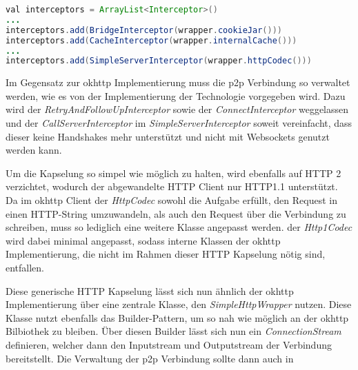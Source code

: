         \begin{lstlisting}[frame=bt, label={lst:android:okhttpchanges}, language=Java, caption=Änderungen an okhttp (Clientcode in Kotlin)]
val interceptors = ArrayList<Interceptor>()
...
interceptors.add(BridgeInterceptor(wrapper.cookieJar()))
interceptors.add(CacheInterceptor(wrapper.internalCache()))
...
interceptors.add(SimpleServerInterceptor(wrapper.httpCodec()))
        \end{lstlisting}
        Im Gegensatz zur okhttp Implementierung muss die p2p Verbindung so verwaltet werden, wie es von der Implementierung der Technologie vorgegeben wird. Dazu wird der {\it RetryAndFollowUpInterceptor} sowie der {\it ConnectInterceptor} weggelassen und der {\it CallServerInterceptor} im {\it SimpleServerInterceptor} soweit vereinfacht, dass dieser keine Handshakes mehr unterstützt und nicht mit Websockets genutzt werden kann.
        
        Um die Kapselung so simpel wie möglich zu halten, wird ebenfalls auf HTTP 2 verzichtet, wodurch der abgewandelte HTTP Client nur HTTP1.1 unterstützt. Da im okhttp Client der {\it HttpCodec} sowohl die Aufgabe erfüllt, den Request in einen HTTP-String umzuwandeln, als auch den Request über die Verbindung zu schreiben, muss so lediglich eine weitere Klasse angepasst werden. der {\it Http1Codec} wird dabei minimal angepasst, sodass interne Klassen der okhttp Implementierung, die nicht im Rahmen dieser HTTP Kapselung nötig sind, entfallen.
                
        Diese generische HTTP Kapselung lässt sich nun ähnlich der okhttp Implementierung über eine zentrale Klasse, den {\it SimpleHttpWrapper} nutzen. Diese Klasse nutzt ebenfalls das Builder-Pattern, um so nah wie möglich an der okhttp Bilbiothek zu bleiben. Über diesen Builder lässt sich nun ein {\it ConnectionStream} definieren, welcher dann den Inputstream und Outputstream der Verbindung bereitstellt. Die Verwaltung der p2p Verbindung sollte dann auch in
        
